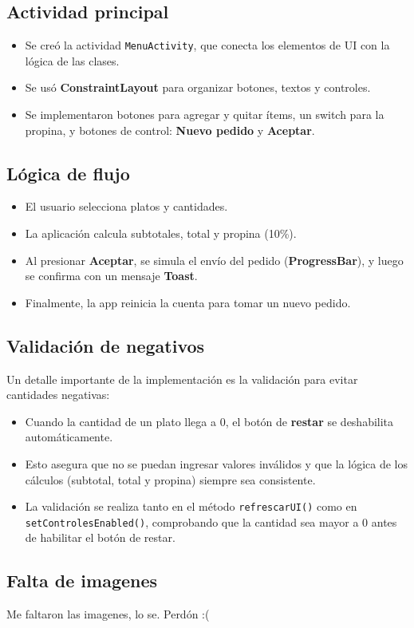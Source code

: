 \documentclass[11pt,a4paper]{article}
\begin{document}
\subsection{Actividad principal}
\label{sec:org248a57e}
\begin{itemize}
\item Se creó la actividad \texttt{MenuActivity}, que conecta los elementos de UI con la lógica de las clases.
\item Se usó \textbf{ConstraintLayout} para organizar botones, textos y controles.
\item Se implementaron botones para agregar y quitar ítems, un switch para la propina, y botones de control: \textbf{Nuevo pedido} y \textbf{Aceptar}.
\end{itemize}
\subsection{Lógica de flujo}
\label{sec:orge18bbc4}
\begin{itemize}
\item El usuario selecciona platos y cantidades.
\item La aplicación calcula subtotales, total y propina (10\%).
\item Al presionar \textbf{Aceptar}, se simula el envío del pedido (\textbf{ProgressBar}), y luego se confirma con un mensaje \textbf{Toast}.
\item Finalmente, la app reinicia la cuenta para tomar un nuevo pedido.
\end{itemize}
\subsection{Validación de negativos}
\label{sec:org01c7dd3}
Un detalle importante de la implementación es la validación para evitar cantidades negativas:
\begin{itemize}
\item Cuando la cantidad de un plato llega a 0, el botón de \textbf{restar} se deshabilita automáticamente.
\item Esto asegura que no se puedan ingresar valores inválidos y que la lógica de los cálculos (subtotal, total y propina) siempre sea consistente.
\item La validación se realiza tanto en el método \texttt{refrescarUI()} como en \texttt{setControlesEnabled()}, comprobando que la cantidad sea mayor a 0 antes de habilitar el botón de restar.
\end{itemize}
\subsection{Falta de imagenes}
\label{sec:orgc5eb0dc}
Me faltaron las imagenes, lo se. Perdón :(
\end{document}

